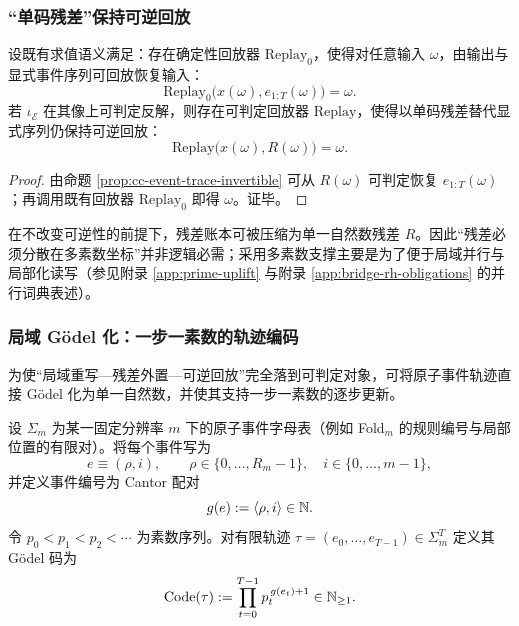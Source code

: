 \subsubsection{“单码残差”保持可逆回放}
\begin{theorem}[残差账本的单码可逆化]\label{thm:cc-singlecode-replay}
设既有求值语义满足：存在确定性回放器 $\mathrm{Replay}_0$，使得对任意输入 $\omega$，由输出与显式事件序列可回放恢复输入：
$$
\mathrm{Replay}_0\bigl(x(\omega),e_{1:T}(\omega)\bigr)=\omega.
$$
若 $\iota_{\mathcal{E}}$ 在其像上可判定反解，则存在可判定回放器 $\mathrm{Replay}$，使得以单码残差替代显式序列仍保持可逆回放：
$$
\mathrm{Replay}\bigl(x(\omega),R(\omega)\bigr)=\omega.
$$
\end{theorem}

\begin{proof}
由命题 \ref{prop:cc-event-trace-invertible} 可从 $R(\omega)$ 可判定恢复 $e_{1:T}(\omega)$；再调用既有回放器 $\mathrm{Replay}_0$ 即得 $\omega$。证毕。
\end{proof}

\begin{corollary}[寄存器配额的结构性极小化]\label{cor:cc-register-min}
在不改变可逆性的前提下，残差账本可被压缩为单一自然数残差 $R$。因此“残差必须分散在多素数坐标”并非逻辑必需；采用多素数支撑主要是为了便于局域并行与局部化读写（参见附录 \ref{app:prime-uplift} 与附录 \ref{app:bridge-rh-obligations} 的并行词典表述）。
\end{corollary}

\subsubsection{局域 Gödel 化：一步一素数的轨迹编码}\label{subsubsec:cc-local-godel-prime-step}
为使“局域重写—残差外置—可逆回放”完全落到可判定对象，可将原子事件轨迹直接 Gödel 化为单一自然数，并使其支持一步一素数的逐步更新。

\begin{definition}[事件编号与一步一素数编码]\label{def:cc-stepwise-prime-godel}
设 $\Sigma_m$ 为某一固定分辨率 $m$ 下的原子事件字母表（例如 Fold$_m$ 的规则编号与局部位置的有限对）。将每个事件写为
$$
e\equiv(\rho,i),\qquad \rho\in\{0,\dots,R_m-1\},\quad i\in\{0,\dots,m-1\},
$$
并定义事件编号为 Cantor 配对
$$
g(e):=\langle \rho,i\rangle\in\mathbb{N}.
$$
令 $p_0<p_1<p_2<\cdots$ 为素数序列。对有限轨迹 $\tau=(e_0,\dots,e_{T-1})\in\Sigma_m^{T}$ 定义其 Gödel 码为
$$
\mathrm{Code}(\tau):=\prod_{t=0}^{T-1}p_t^{\,g(e_t)+1}\in\mathbb{N}_{\ge 1}.
$$
\end{definition}


